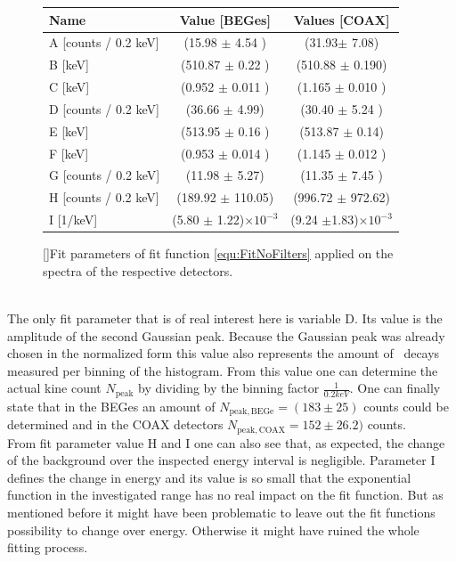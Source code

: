 \documentclass[encoding=utf8,british]{tumphthesis}
\begin{document}
\begin{figure}[t!]
\centering
\begin{tabular}{|l|c|c|}
\hline
Name	& Value [BEGes] & Values [COAX]\\ 
\hline
A [counts / 0.2 keV] &	(15.98 \(\pm\)	4.54	)&	(31.93\(\pm\)	7.08)	\\	
\hline
B [keV] &	(510.87 \(\pm\)	0.22	)&	(510.88 \(\pm\)	0.190)\\	
\hline
C [keV] &	(0.952 \(\pm\)	0.011	)	&	(1.165 \(\pm\)	0.010	)	\\
\hline
D [counts / 0.2 keV] &	(36.66 \(\pm\)	4.99)	&	(30.40 \(\pm\)	5.24	)	\\
\hline
E [keV] &	(513.95 \(\pm\)	0.16	)	&	(513.87 \(\pm\)	0.14)	\\
\hline
F [keV] &	(0.953 \(\pm\)	0.014	)	&	(1.145 \(\pm\)	0.012	)	\\
\hline
G [counts / 0.2 keV] &	(11.98 \(\pm\)	5.27)	&	(11.35 \(\pm\)	7.45	)	\\
\hline
H [counts / 0.2 keV] &	(189.92 \(\pm\)	110.05)	&	(996.72 \(\pm\)	972.62)	\\
\hline
I [1/keV] &	(5.80 \(\pm\) 1.22)$\times10^{-3}$	&	(9.24 \(\pm\)1.83)$\times10^{-3}$ \\
\hline

\end{tabular}
\label{tab:FitParNoFilter}
[]{Fit parameters of fit function \ref{equ:FitNoFilters} applied on the spectra of the respective detectors.}
\end{figure}
\\

The only fit parameter that is of real interest here is variable D.
Its value is the amplitude of the second Gaussian peak.
Because the Gaussian peak was already chosen in the normalized form this value also represents the amount of \Kr\ decays measured per binning of the histogram.
From this value one can determine the actual kine count $N_{\mathrm{peak}}$ by dividing by the binning factor $\frac{1}{0.2 \unit{keV}}$.
One can finally state that in the BEGes an amount of $N_{\mathrm{peak,BEGe}} = (183\pm25)$ counts could be determined and in the COAX detectors $N_{\mathrm{peak,COAX}} = 152\pm26.2)$ counts.
\\


From fit parameter value H and I one can also see that, as expected, the change of the background over the inspected energy interval is negligible.
Parameter I defines the change in energy and its value is so small that the exponential function in the investigated range has no real impact on the fit function.
But as mentioned before it might have been problematic to leave out the fit functions possibility to change over energy.
Otherwise it might have ruined the whole fitting process. 
\\
\end{document}

